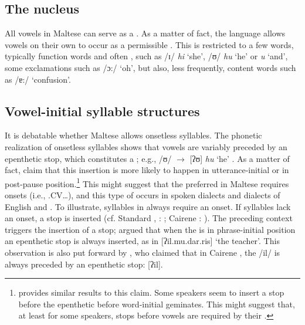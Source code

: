 \documentclass[output=paper]{langsci/langscibook}
\begin{document}


\subsection{The nucleus}


All vowels in Maltese can serve as a . As a matter of fact, the language allows vowels on their own to occur as a permissible . This is restricted to a few words, typically function words and often , such as /ɪ/ \textit{hi} ‘she’, /ʊ/ \textit{hu} ‘he’ or \textit{u} ‘and’, some exclamations such as /ɔ:/ ‘oh’, but also, less frequently, content words such as /ɐ:/ ‘confusion’. 


\subsection{Vowel-initial syllable structures} 

It is debatable whether Maltese allows onsetless syllables. The phonetic realization of onsetless syllables shows that vowels are variably preceded by an epenthetic  stop, which constitutes a ; e.g., /ʊ/ $\rightarrow$ [ʔʊ] \textit{hu} ‘he’ \citep{azzopardi1981phonetics}. As a matter of fact, \citet{maltese_book} claim that this insertion is more likely to happen in utterance-initial or in post-pause position.\footnote{\citet{lukediss} provides similar results to this claim. Some speakers seem to insert a  stop before the epenthetic  before word-initial geminates. This might suggest that, at least for some speakers,  stops before vowels are required by their .}  This might suggest that the preferred  in Maltese requires onsets (i.e., .CV…), and this type of  occurs in spoken  dialects and dialects of English and . To illustrate, syllables in  always require an onset. If syllables lack an onset, a  stop is inserted (cf. Standard ,  : \citet{gadoua2000consonant}; Cairene : \citet{wiltshire1998extending,youssef2013place}). The preceding context triggers the insertion of a  stop; \citet{wiltshire1998extending} argued that when the  is in phrase-initial position an epenthetic  stop is always inserted, as in [ʔil.mu.dar.ris] ‘the teacher’. This observation is also put forward by \citet{youssef2013place}, who claimed that in Cairene , the  /il/ is always preceded by an epenthetic  stop: [ʔil]. 
\end{document}
